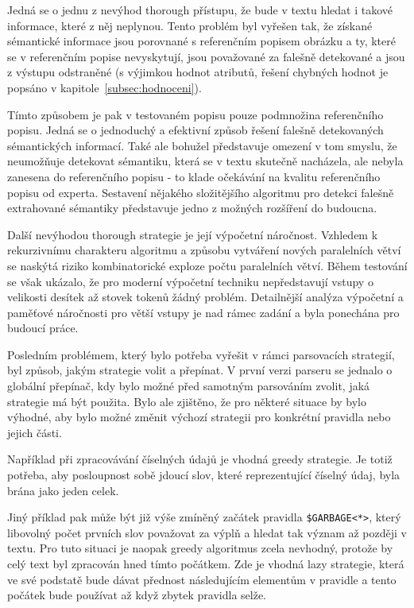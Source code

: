 Jedná se o jednu z nevýhod thorough přístupu, že bude v textu hledat i takové informace, které z něj neplynou.
Tento problém byl vyřešen tak, že získané sémantické informace jsou porovnané s referenčním popisem obrázku a ty,
které se v referenčním popise nevyskytují, jsou považované za falešně detekované a jsou z výstupu odstraněné
(s výjimkou hodnot atributů, řešení chybných hodnot je popsáno v kapitole~\ref{subsec:hodnoceni}).

Tímto způsobem je pak v testovaném popisu pouze podmnožina referenčního popisu.
Jedná se o jednoduchý a efektivní způsob řešení falešně detekovaných sémantických informací.
Také ale bohužel představuje omezení v tom smyslu, že neumožňuje detekovat sémantiku, která se v textu skutečně nacházela,
ale nebyla zanesena do referenčního popisu - to klade očekávání na kvalitu referenčního popisu od experta.
Sestavení nějakého složitějšího algoritmu pro detekci falešně extrahované sémantiky představuje jedno z možných rozšíření do budoucna.

Další nevýhodou thorough strategie je její výpočetní náročnost.
Vzhledem k rekurzivnímu charakteru algoritmu a způsobu vytváření nových paralelních větví
se naskýtá riziko kombinatorické exploze počtu paralelních větví.
Během testování se však ukázalo, že pro moderní výpočetní techniku nepředstavují vstupy o velikosti desítek až stovek tokenů žádný problém.
Detailnější analýza výpočetní a paměťové náročnosti pro větší vstupy je nad rámec zadání a byla ponechána pro budoucí práce.

Posledním problémem, který bylo potřeba vyřešit v rámci parsovacích strategií, byl způsob, jakým strategie volit a přepínat.
V první verzi parseru se jednalo o globální přepínač, kdy bylo možné před samotným parsováním zvolit, jaká strategie má být použita.
Bylo ale zjištěno, že pro některé situace by bylo výhodné, aby bylo možné změnit výchozí strategii pro konkrétní pravidla nebo jejich části.

Například při zpracovávání číselných údajů je vhodná greedy strategie.
Je totiž potřeba, aby posloupnost sobě jdoucí slov, které reprezentující číselný údaj, byla brána jako jeden celek.

Jiný příklad pak může být již výše zmíněný začátek pravidla \texttt{\$GARBAGE<*>},
který libovolný počet prvních slov považovat za výplň a hledat tak význam až později v textu.
Pro tuto situaci je naopak greedy algoritmus zcela nevhodný, protože by celý text byl zpracován hned tímto počátkem.
Zde je vhodná lazy strategie, která ve své podstatě bude dávat přednost následujícím elementům v pravidle a tento počátek bude používat až
když zbytek pravidla selže.

